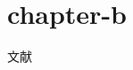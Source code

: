 \chapter{chapter-b}

\begin{refsection}



文献\citet{walls,sommers}


\citep{wfz}







\end{refsection}

